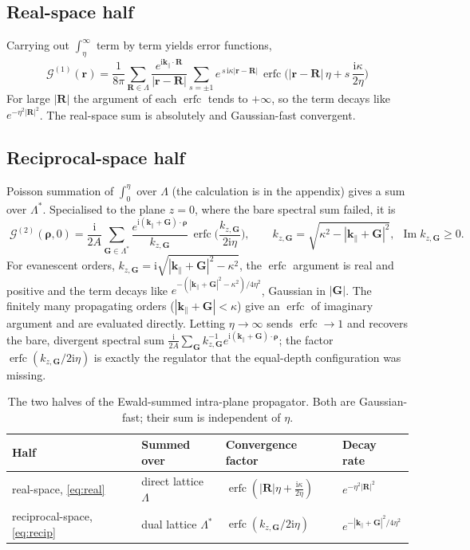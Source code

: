 \documentclass[11pt,a4paper]{article}
\DeclareMathOperator{\erfc}{erfc}
\newcommand{\ii}{\mathrm{i}}
\newcommand{\Imm}{\operatorname{Im}}
\newcommand{\kpar}{\mathbf{k}_{\parallel}}
\newcommand{\vr}{\mathbf{r}}
\newcommand{\vR}{\mathbf{R}}
\newcommand{\vG}{\mathbf{G}}
\newcommand{\brho}{\boldsymbol{\rho}}
\newcommand{\Lat}{\Lambda}
\newcommand{\dLat}{\Lambda^{\ast}}
\newcommand{\kzG}{k_{z,\vG}}
\begin{document}
\subsection{Real-space half}

Carrying out $\int_\eta^\infty$ term by term yields error functions,
\begin{equation}
\label{eq:real}
\boxed{\;
\mathcal{G}^{(1)}(\vr)
=
\frac{1}{8\pi}\sum_{\vR\in\Lat}\frac{e^{\ii\kpar\cdot\vR}}{|\vr-\vR|}
\sum_{s=\pm 1}
e^{\,s\,\ii\kappa|\vr-\vR|}\,
\erfc\!\Big(|\vr-\vR|\,\eta+s\,\frac{\ii\kappa}{2\eta}\Big)\; }
\end{equation}
For large $|\vR|$ the argument of each $\erfc$ tends to $+\infty$, so the term decays like
$e^{-\eta^{2}|\vR|^{2}}$. The real-space sum is absolutely and Gaussian-fast convergent.

\subsection{Reciprocal-space half}

Poisson summation of $\int_0^\eta$ over $\Lat$ (the calculation is in the appendix) gives a
sum over $\dLat$. Specialised to the plane $z=0$, where the bare spectral sum failed, it is
\begin{equation}
\label{eq:recip}
\boxed{\;
\mathcal{G}^{(2)}(\brho,0)
=
\frac{\ii}{2A}\sum_{\vG\in\dLat}
\frac{e^{\ii(\kpar+\vG)\cdot\brho}}{\kzG}\,
\erfc\!\Big(\frac{\kzG}{2\ii\eta}\Big),
\qquad
\kzG=\sqrt{\kappa^{2}-|\kpar+\vG|^{2}},\ \ \Imm\kzG\ge 0. \;}
\end{equation}
For evanescent orders, $\kzG=\ii\sqrt{|\kpar+\vG|^{2}-\kappa^{2}}$, the $\erfc$ argument is
real and positive and the term decays like $e^{-(|\kpar+\vG|^{2}-\kappa^{2})/4\eta^{2}}$,
Gaussian in $|\vG|$. The finitely many propagating orders ($|\kpar+\vG|<\kappa$) give an
$\erfc$ of imaginary argument and are evaluated directly. Letting $\eta\to\infty$ sends
$\erfc\to 1$ and recovers the bare, divergent spectral sum
$\tfrac{\ii}{2A}\sum_{\vG}\kzG^{-1}e^{\ii(\kpar+\vG)\cdot\brho}$; the factor
$\erfc(\kzG/2\ii\eta)$ is exactly the regulator that the equal-depth configuration was
missing.

\begin{table}[h]
\centering
\renewcommand{\arraystretch}{1.3}
\begin{tabular}{@{}llll@{}}
\toprule
Half & Summed over & Convergence factor & Decay rate \\
\midrule
real-space, \eqref{eq:real} & direct lattice $\Lat$ &
$\erfc(|\vR|\eta+\tfrac{\ii\kappa}{2\eta})$ & $e^{-\eta^{2}|\vR|^{2}}$ \\
reciprocal-space, \eqref{eq:recip} & dual lattice $\dLat$ &
$\erfc(\kzG/2\ii\eta)$ & $e^{-|\kpar+\vG|^{2}/4\eta^{2}}$ \\
\bottomrule
\end{tabular}
\caption{The two halves of the Ewald-summed intra-plane propagator. Both are Gaussian-fast;
their sum is independent of $\eta$.}
\end{table}
\end{document}
